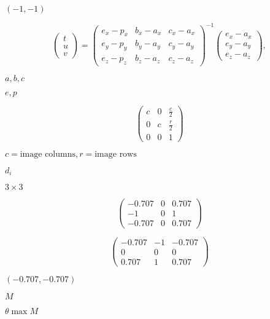 \documentclass{article}
\begin{document}
$(-1, -1)$
\pagebreak

\[ \left(\begin{array}{c} t \\ u \\ v \end{array}\right) = \left(\begin{array}{ccc} e_x - p_x & b_x - a_x & c_x - a_x \\ e_y - p_y & b_y - a_y & c_y - a_y \\ e_z - p_z & b_z - a_z & c_z - a_z \end{array}\right)^{-1} \left(\begin{array}{c} e_x - a_x \\ e_y - a_y \\ e_z - a_z \end{array}\right), \]
\pagebreak

$a, b, c$
\pagebreak

$e, p$
\pagebreak

\[ \left( \begin{array}{ccc} c & 0 & \frac{c}{2} \\ 0 & c & \frac{r}{2} \\ 0 & 0 & 1 \end{array} \right) \]
\pagebreak

$c=\mbox{image columns}, r = \mbox{image rows}$
\pagebreak

$d_i$
\pagebreak

$3 \times 3$
\pagebreak

\[ \left( \begin{array}{ccc} -0.707 & 0 & 0.707 \\ -1 & 0 & 1 \\ -0.707 & 0 & 0.707 \end{array} \right) \]
\pagebreak

\[ \left( \begin{array}{ccc} -0.707 & -1 & -0.707 \\ 0 & 0 & 0 \\ 0.707 & 1 & 0.707 \end{array} \right) \]
\pagebreak

$(-0.707, -0.707)$
\pagebreak

$ M $
\pagebreak

$ \theta \max M $
\pagebreak
\end{document}
